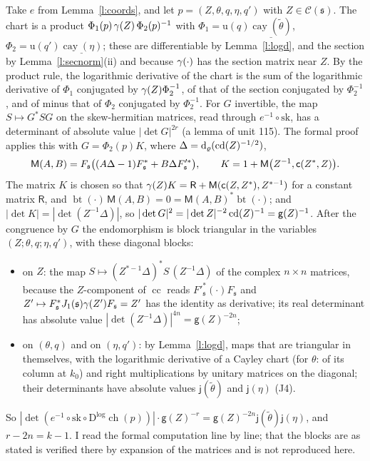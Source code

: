 \documentclass[11pt,a4paper]{article}
\makeatletter
\theoremstyle{plainx}
\theoremstyle{uprightx}
\renewenvironment{proof}[1][Proof]{\par\pushQED{\qed}\normalfont\topsep0pt\partopsep0pt
  \trivlist\item[\hskip\labelsep\itshape #1.]\ignorespaces}{\popQED\endtrivlist\@endpefalse}
\newcommand{\Jone}[1]{J_1(#1)}
\newcommand{\Inp}[1]{\textup{(#1)}}
\newcommand{\emb}[1]{\underline{#1}}
\newcommand{\uq}[1]{\mathrm{u}(#1)}
\newcommand{\cay}[1]{\operatorname{cay}(#1)}
\newcommand{\cayd}[1]{\mathsf{j}(#1)}
\newcommand{\gd}[1]{\mathsf{g}(#1)}
\newcommand{\Ocell}[1]{\mathcal{C}(#1)}
\newcommand{\chart}{\operatorname{ch}}
\newcommand{\chartc}{\operatorname{cc}}
\newcommand{\btan}{\operatorname{bt}}
\makeatother
\begin{document}
\begin{proof}[Proof of Theorem A\textup{(i)}]
Take $e$ from Lemma~\ref{l:coords}, and let $p=(Z,\theta,q,\eta,q')$ with $Z\in\Ocell{\mathfrak{s}}$. The chart is
a product $\Phi_1(p)\,\gamma(Z)\,\Phi_2(p)^{-1}$ with $\Phi_1=\uq{q}\emb{\cay{\tilde\theta}}$,
$\Phi_2=\uq{q'}\emb{\cay{\eta}}$; these are differentiable by Lemma~\ref{l:logd}, and the section by
Lemma~\ref{l:secnorm}(ii) and because $\gamma(\cdot)$ has the section matrix near $Z$. By the product rule, the logarithmic derivative of the chart is the sum of the logarithmic derivative of $\Phi_1$
conjugated by $\gamma(Z)\Phi_2^{-1}$, of that of the section conjugated by $\Phi_2^{-1}$, and of minus that of
$\Phi_2$ conjugated by $\Phi_2^{-1}$. For $G$ invertible, the map $S\mapsto G^{*}SG$ on the skew-hermitian matrices,
read through $e^{-1}\circ\mathrm{sk}$, has a determinant of absolute value $|\det G|^{2r}$ (a lemma of unit 115). The
formal proof applies this with $G=\Phi_2(p)K$, where $\Delta=\operatorname{d}_{\varrho}(\operatorname{cd}(Z)^{-1/2})$,
\[\mathsf{M}(A,B)=F_{\mathfrak{s}}\bigl((A\Delta-1)F_{\mathfrak{s}}^{*}+B\Delta F'^{*}_{\mathfrak{s}}\bigr),\qquad
K=1+\mathsf{M}\bigl(Z^{-1},\mathsf{c}(Z^{*},Z)\bigr).\]
The matrix $K$ is chosen so that $\gamma(Z)K=\mathsf{R}+\mathsf{M}(\mathsf{c}(Z,Z^{*}),Z^{*-1})$ for a
constant matrix $\mathsf{R}$, and $\btan(\cdot)\,\mathsf{M}(A,B)=0=\mathsf{M}(A,B)^{*}\btan(\cdot)$; and
$|\det K|=|\det(Z^{-1}\Delta)|$, so $|\det G|^{2}=|\det Z|^{-2}\cornerDefect{Z}^{-1}=\gd{Z}^{-1}$. After the
congruence by $G$ the endomorphism is block triangular in the variables $(Z;\theta,q;\eta,q')$, with these diagonal
blocks:
\begin{itemize}
\item on $Z$: the map $S\mapsto(Z^{*-1}\Delta)^{*}S\,(Z^{-1}\Delta)$ of the complex $n\times n$ matrices, because the
  $Z$-component of $\chartc$ reads $F'^{*}_{\mathfrak{s}}(\cdot)F_{\mathfrak{s}}$ and
  $Z'\mapsto F_{\mathfrak{s}}^{*}\Jone{\mathfrak{s}}\gramSection{Z'}F_{\mathfrak{s}}=Z'$ has the identity as derivative;
  its real determinant has absolute value $|\det(Z^{-1}\Delta)|^{4n}=\gd{Z}^{-2n}$;
\item on $(\theta,q)$ and on $(\eta,q')$: by Lemma~\ref{l:logd}, maps that are triangular in themselves, with the
  logarithmic derivative of a Cayley chart (for $\theta$: of its column at $k_0$) and right multiplications by
  unitary matrices on the diagonal; their determinants have absolute values $\cayd{\tilde\theta}$ and $\cayd{\eta}$
  \Inp{J4}.
\end{itemize}
So $|\det(e^{-1}\circ\mathrm{sk}\circ\mathrm{D}^{\log}\chart(p))|\cdot\gd{Z}^{-r}=\gd{Z}^{-2n}\cayd{\tilde\theta}\cayd{\eta}$,
and $r-2n=k-1$. I read the formal computation line by line; that the blocks are as stated is verified there by
expansion of the matrices and is not reproduced here.
\end{proof}
\end{document}
